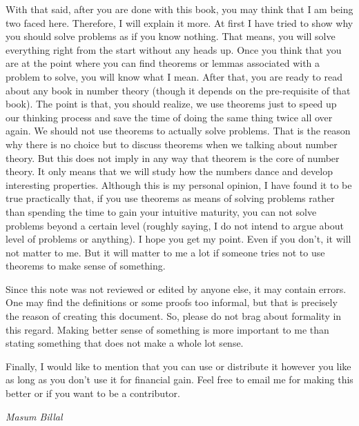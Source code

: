 \documentclass[a4paper, 12pt, leqno]{article}
\theoremstyle{definition}
\theoremstyle{remark}
\begin{document}
		With that said, after you are done with this book, you may think that I am being two faced here. Therefore, I will explain it more. At first I have tried to show why you should solve problems as if you know nothing. That means, you will solve everything right from the start without any heads up. Once you think that you are at the point where you can find theorems or lemmas associated with a problem to solve, you will know what I mean. After that, you are ready to read about any book in number theory (though it depends on the pre-requisite of that book). The point is that, you should realize, we use theorems just to speed up our thinking process and save the time of doing the same thing twice all over again. We should not use theorems to actually solve problems. That is the reason why there is no choice but to discuss theorems when we talking about number theory. But this does not imply in any way that theorem is the core of number theory. It only means that we will study how the numbers dance and develop interesting properties. Although this is my personal opinion, I have found it to be true practically that, if you use theorems as means of solving problems rather than spending the time to gain your intuitive maturity, you can not solve problems beyond a certain level (roughly saying, I do not intend to argue about level of problems or anything). I hope you get my point. Even if you don't, it will not matter to me. But it will matter to me a lot if someone tries not to use theorems to make sense of something.
		
		Since this note was not reviewed or edited by anyone else, it may contain errors. One may find the definitions or some proofs too informal, but that is precisely the reason of creating this document. So, please do not brag about formality in this regard. Making better sense of something is more important to me than stating something that does not make a whole lot sense.
		
		Finally, I would like to mention that you can use or distribute it however you like as long as you don't use it for financial gain. Feel free to email me for making this better or if you want to be a contributor.
			\begin{flushright}
				\slshape Masum Billal\\
				\date{October $10$, $2016$}
			\end{flushright}
		\newpage
\end{document}
